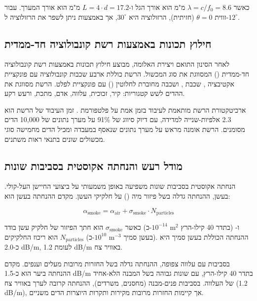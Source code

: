 כאשר $\lambda = c/f_0 = 8.6$ מ"מ הוא אורך הגל ו-$L = 4 \cdot d = 17.2$ מ"מ הוא אורך המערך. עבור זווית $\theta = 0$ (חזיתית), הרזולוציה היא $30^\circ$, אך באמצעות  ניתן לשפר את הרזולוציה ל-$12^\circ$. \cite{CrewAIDocs}

\subsection{חילוץ תכונות באמצעות רשת קונבולוציה חד-ממדית}
\label{sec:ch03_feature_extraction}

לאחר הסינון התואם ויצירת האלומה, מבוצע חילוץ תכונות באמצעות רשת קונבולוציה חד-ממדית () המסווגת את סוג המכשול. הרשת כוללת ארבע שכבות קונבולוציה עם פונקציית אקטיבציה , שכבת , ושכבה מחוברת לחלוטין () עם פונקציית  לפלט. הרשת מסווגת את ההדים לשש קטגוריות: קיר, זכוכית, עלווה, אדם, מתכת, ורעש רקע. \cite{CrewAIDocs}

ארכיטקטורת הרשת מותאמת לעיבוד בזמן אמת על פלטפורמת . זמן העיבוד של הרשת הוא 2.3 אלפיות-שנייה למדידה, עם דיוק סיווג של 91\% על מערך נתונים של 10,000 הדים מסומנים. הרשת אומנה מראש על מערך נתונים שנאסף במעבדה ומכיל הדים מחמישה סוגי מכשולים שונים בתנאי ראות משתנים. \cite{CrewAIDocs}

\subsection{מודל רעש והנחתה אקוסטית בסביבות שונות}
\label{sec:ch03_noise_model}

הנחתה אקוסטית בסביבות שונות משפיעה באופן משמעותי על ביצועי החיישן העל-קולי. בעשן, ההנחתה גדלה בשל פיזור מיה () על חלקיקי העשן. מקדם ההנחתה בעשן הוא:

\begin{equation}
\alpha_{\text{smoke}} = \alpha_{\text{air}} + \sigma_{\text{smoke}} \cdot N_{\text{particles}}
\label{eq:ch03_smoke_attenuation}
\end{equation}

כאשר $\sigma_{\text{smoke}}$ הוא חתך הפיזור של חלקיק עשן בודד (כ-$10^{-14}$ m$^2$ בתדר 40 קילו-הרץ) ו-$N_{\text{particles}}$ הוא ריכוז החלקיקים (כ-$10^{10}$ m$^{-3}$ בעשן סמיך). ההנחתה הכוללת בעשן סמיך היא כ-2.0 dB/m, לעומת 1.2 dB/m באוויר צח. \cite{CrewAIDocs}

בסביבות עם עלווה צפופה, ההנחתה גדלה בשל החזרות מרובות מעלים וענפים. מקדם ההנחתה ביער הוא כ-1.5 dB/m בתדר 40 קילו-הרץ, עם שונות גבוהה בשל המבנה הלא-אחיד של העלווה. בסביבות פנים-מבנה (מחסנים, משרדים), ההנחתה קרובה לערך באוויר צח (1.2 dB/m), אך קיימות החזרות מרובות מקירות ותקרות היוצרות הדים משניים. \cite{CrewAIDocs}

